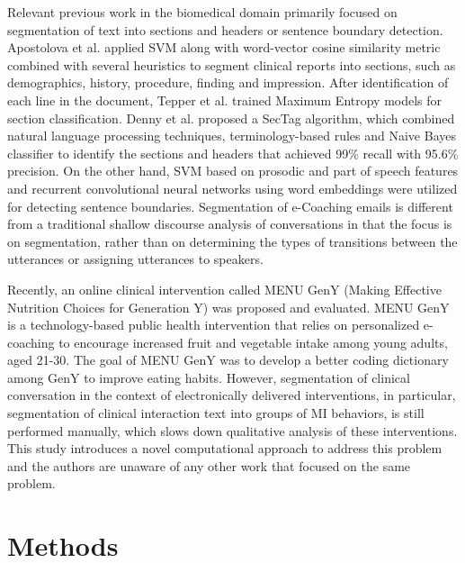 \documentclass{amia}
\begin{document}
Relevant previous work in the biomedical domain primarily focused on segmentation of text into sections and headers\cite{apostolova2009automatic,denny2009evaluation,tepper2012statistical,cho2002text} or sentence boundary detection\cite{griffis2016quantitative,kreuzthaler2015detection,treviso2016sentence}. Apostolova et al.\cite{apostolova2009automatic} applied SVM along with word-vector cosine similarity metric combined with several heuristics to segment clinical reports into sections, such as demographics, history, procedure, finding and impression. After identification of each line in the document, Tepper et al. \cite{tepper2012statistical} trained Maximum Entropy models for section classification. Denny et al.\cite{denny2009evaluation} proposed a SecTag algorithm, which combined natural language processing techniques, terminology-based rules and Naive Bayes classifier to identify the sections and headers that achieved 99\% recall with 95.6\% precision. On the other hand, SVM based on prosodic and part of speech features \cite{kreuzthaler2015detection} and recurrent convolutional neural networks using word embeddings \cite{griffis2016quantitative} were utilized for detecting sentence boundaries. Segmentation of e-Coaching emails is different from a traditional shallow discourse analysis of conversations \cite{galley2003discourse} in that the focus is on segmentation, rather than on determining the types of transitions between the utterances or assigning utterances to speakers.

Recently, an online clinical intervention called MENU GenY \cite{alexander2017motivations} (Making Effective Nutrition Choices for Generation Y) was proposed and evaluated. MENU GenY is a technology-based public health intervention that relies on personalized e-coaching to encourage increased fruit and vegetable intake among young adults, aged 21-30. The goal of MENU GenY was to develop a better coding dictionary among GenY to improve eating habits. However, segmentation of clinical conversation in the context of electronically delivered interventions, in particular, segmentation of clinical interaction text into groups of MI behaviors, is still performed manually, which slows down qualitative analysis of these interventions. This study introduces a novel computational approach to address this problem and the authors are unaware of any other work that focused on the same problem.  

\section*{Methods}
\end{document}

